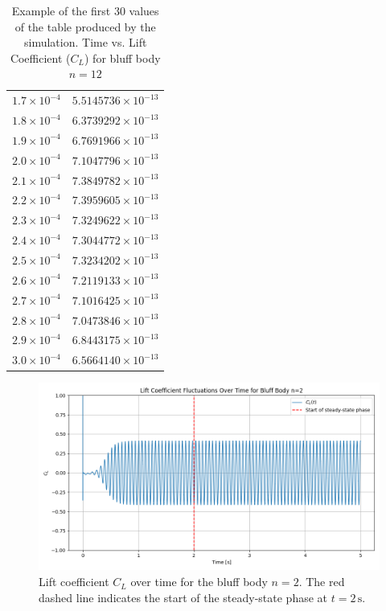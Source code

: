 \begin{table}[H]
\begin{tabular}{|c|c|}
		$1.7 \times 10^{-4}$ & $5.5145736 \times 10^{-13}$ \\
		$1.8 \times 10^{-4}$ & $6.3739292 \times 10^{-13}$ \\
		$1.9 \times 10^{-4}$ & $6.7691966 \times 10^{-13}$ \\
		$2.0 \times 10^{-4}$ & $7.1047796 \times 10^{-13}$ \\
		$2.1 \times 10^{-4}$ & $7.3849782 \times 10^{-13}$ \\
		$2.2 \times 10^{-4}$ & $7.3959605 \times 10^{-13}$ \\
		$2.3 \times 10^{-4}$ & $7.3249622 \times 10^{-13}$ \\
		$2.4 \times 10^{-4}$ & $7.3044772 \times 10^{-13}$ \\
		$2.5 \times 10^{-4}$ & $7.3234202 \times 10^{-13}$ \\
		$2.6 \times 10^{-4}$ & $7.2119133 \times 10^{-13}$ \\
		$2.7 \times 10^{-4}$ & $7.1016425 \times 10^{-13}$ \\
		$2.8 \times 10^{-4}$ & $7.0473846 \times 10^{-13}$ \\
		$2.9 \times 10^{-4}$ & $6.8443175 \times 10^{-13}$ \\
		$3.0 \times 10^{-4}$ & $6.5664140 \times 10^{-13}$ \\
		\hline
	\end{tabular}
	\label{tab:12FaceClTable}
	\caption{Example of the first 30 values of the table produced by the simulation. Time vs. Lift Coefficient ($C_L$) for bluff body $n=12$}
\end{table}

\begin{figure}[H]
	\centering
	\includegraphics[width=\textwidth]{images/2FaceGraph}
	\caption{Lift coefficient $C_L$ over time for the bluff body $n=2$. The red dashed line indicates the start of the steady-state phase at $t = 2\,\mathrm{s}$.}
	\label{fig:2faceGraph}
\end{figure}




